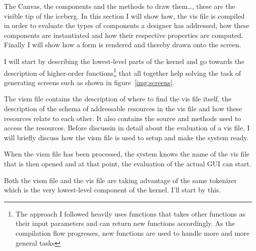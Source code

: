 The Canvas, the components and the methods to draw them\dots, these are the visible tip of the iceberg. In this section I will show how, the vis file is compiled in order to evaluate the types of components a designer has addressed, how these components are instantiated and how their respective properties are computed. Finally I will show how a form is rendered and thereby drawn onto the screen. 

I will start by describing the lowest-level parts of the kernel and go towards the description of higher-order functions\footnote{The approach I followed heavily uses functions that takes other functions as their input parameters and can return new functions accordingly. As the compilation flow progresses, new functions are used to handle more and more general tasks} that all together help solving the task of generating screens such as shown in figure~\ref{img:screens}.

The vism file contains the description of where to find the vis file itself, the description of the schema of addressable resources in the vis file and how these resources relate to each other. It also contains the source and methods used to access the resources. Before discussin in detail about the evaluation of a vis file, I will briefly discuss how the vism file is used to setup and make the system ready.

When the vism file has been processed, the system knows the name of the vis file that is then opened and at that point, the evaluation of the actual GUI can start.

Both the vism file and the vis file are taking advantage of the same tokenizer which is the very lowest-level component of the kernel. I'll start by this.